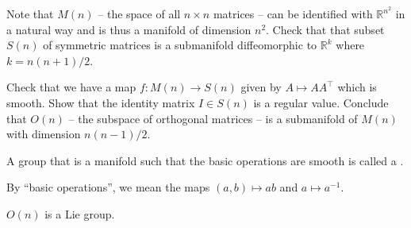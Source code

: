 \documentclass[12pt]{article}
\begin{document}
\begin{exe}
	Note that $M(n)$ -- the space of all $n \times n$ matrices -- can be identified with $\mathbb{R}^{n^{2}}$ in a natural way and is thus a manifold of dimension $n^{2}$. Check that that subset $S(n)$ of symmetric matrices is a submanifold diffeomorphic to $\mathbb{R}^{k}$ where $k = n(n + 1)/2$.

	Check that we have a map $f : M(n) \to S(n)$ given by $A \mapsto AA^{\top}$ which is smooth. Show that the identity matrix $I \in S(n)$ is a regular value. Conclude that $O(n)$ -- the subspace of orthogonal matrices -- is a submanifold of $M(n)$ with dimension $n(n - 1)/2$.
\end{exe}

\begin{defn}
	A group that is a manifold such that the basic operations are smooth is called a .
\end{defn}
By ``basic operations'', we mean the maps $(a, b) \mapsto ab$ and $a \mapsto a^{-1}$.

\begin{ex}
	$O(n)$ is a Lie group.
\end{ex}
\end{document}
